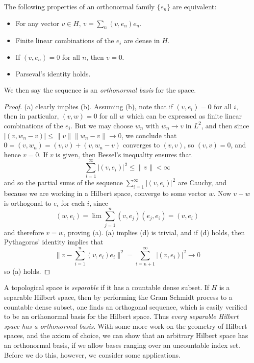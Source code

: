 \begin{theorem}
    The following properties of an orthonormal family $\{ e_n \}$ are equivalent:
    \begin{itemize}
        \item[(a)] For any vector $v \in H$, $v = \sum_n (v,e_n) e_n$.
        \item[(b)] Finite linear combinations of the $e_i$ are dense in $H$.
        \item[(c)] If $(v,e_n) = 0$ for all $n$, then $v = 0$.
        \item[(d)] Parseval's identity holds.
    \end{itemize}
    We then say the sequence is an \emph{orthonormal basis} for the space.
\end{theorem}
\begin{proof}
    (a) clearly implies (b). Assuming (b), note that if $(v,e_i) = 0$ for all $i$, then in particular, $(v,w) = 0$ for all $w$ which can be expressed as finite linear combinations of the $e_i$. But we may choose $w_n$ with $w_n \to v$ in $L^2$, and then since $|(v,w_n - v)| \leq \|v\|\|w_n - v\| \to 0$, we conclude that $0 = (v,w_n) = (v,v) + (v,w_n-v)$ converges to $(v,v)$, so $(v,v) = 0$, and hence $v = 0$. If $v$ is given, then Bessel's inequality ensures that
    \[ \sum_{i = 1}^\infty |(v,e_i)|^2 \leq \| v \| < \infty \]
    and so the partial sums of the sequence $\sum_{i = 1}^\infty |(v,e_i)|^2$ are Cauchy, and because we are working in a Hilbert space, converge to some vector $w$. Now $v - w$ is orthogonal to $e_i$ for each $i$, since
    \[ (w,e_i) = \lim \sum_{j = 1}^n (v,e_j)(e_j,e_i) = (v,e_i) \]
    and therefore $v = w$, proving (a). (a) implies (d) is trivial, and if (d) holds, then Pythagoras' identity implies that
    \[ \| v - \sum_{i = 1}^n (v,e_i) e_i \|^2 = \sum_{i = n+1}^\infty |(v,e_i)|^2 \to 0 \]
    so (a) holds.
\end{proof}

A topological space is {\it separable} if it has a countable dense subset. If $H$ is a separable Hilbert space, then by performing the Gram Schmidt process to a countable dense subset, one finds an orthogonal sequence, which is easily verified to be an orthonormal basis for the Hilbert space. Thus \emph{every separable Hilbert space has a orthonormal basis}. With some more work on the geometry of Hilbert spaces, and the axiom of choice, we can show that an arbitrary Hilbert space has an orthonormal basis, if we allow bases ranging over an uncountable index set. Before we do this, however, we consider some applications.

